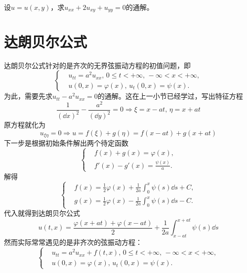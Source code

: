 \begin{problembox}
    \begin{exercise}
        设$u = u(x, y)$，求$u_{xx} + 2 u_{xy} + u_{yy} = 0$的通解。
    \end{exercise}
\end{problembox}
\section{达朗贝尔公式}
达朗贝尔公式针对的是齐次的无界弦振动方程的初值问题，即
\begin{equation*}
    \left\{
        \begin{aligned}
            &u_{tt} = a^2 u_{xx},\, 0 \leq t < +\infty,\, -\infty < x < +\infty,\\
            &u(0, x) = \varphi(x),\, u_t(0, x) = \psi(x).
        \end{aligned}
    \right.
\end{equation*}
为此，需要先求$u_{tt} - a^2 u_{xx} = 0$的通解。这在上一小节已经学过，写出特征方程
\[\frac{1}{\left(\dd{x}\right)^2} - \frac{a^2}{\left(\dd{y}\right)^2} = 0 \Rightarrow \xi = x - a t,\, \eta = x + at\]
原方程就化为
\[u_{\xi \eta} = 0 \Rightarrow u = f(\xi) + g(\eta) = f(x - a t) + g(x + a t)\]
下一步是根据初始条件解出两个待定函数
\begin{equation*}
    \left\{
        \begin{aligned}
            &f(x) + g(x) = \varphi(x),\\
            &f'(x) - g'(x) = \frac{\psi(x)}{a}.
        \end{aligned}
    \right.
\end{equation*}
解得
\begin{equation*}
    \left\{
        \begin{aligned}
            &f(x) = \frac{1}{2}\varphi(x) + \frac{1}{2a} \int_{0}^{x} \psi(s) \dd{s} + C,\\
            &g(x) = \frac{1}{2}\varphi(x) - \frac{1}{2a} \int_{0}^{x} \psi(s) \dd{s} - C.
        \end{aligned}
    \right.
\end{equation*}
代入就得到\color{red}达朗贝尔公式
\[u(t, x) = \frac{\varphi(x + a t) + \varphi(x - a t)}{2} + \frac{1}{2a}\int_{x - a t}^{x + a t}\psi(s)\dd{s}\]
\color{black}
然而实际常常遇见的是非齐次的弦振动方程：
\begin{equation*}
    \left\{
        \begin{aligned}
            &u_{tt} = a^2 u_{xx} + f(t, x),\, 0 \leq t < +\infty,\, -\infty < x < +\infty,\\
            &u(0, x) = \varphi(x),\, u_t(0, x) = \psi(x).
        \end{aligned}
    \right.
\end{equation*}
